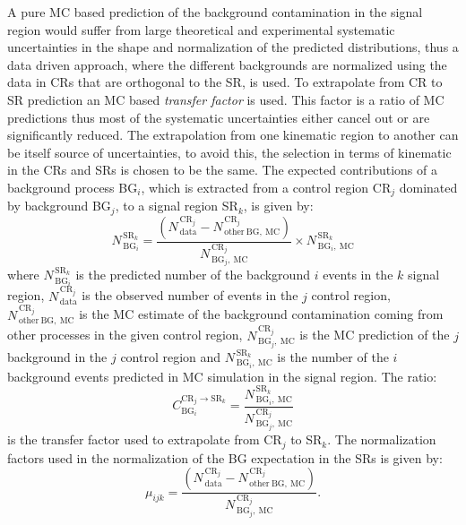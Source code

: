 A pure MC based prediction of the background contamination in the signal region
would suffer from large theoretical and experimental systematic uncertainties in
the shape and normalization of the predicted distributions, thus a data driven
approach, where the different backgrounds are normalized using the data in CRs
that are orthogonal to the SR, is used. To extrapolate from CR to SR prediction
an MC based \emph{transfer factor} is used. This factor is a ratio of MC
predictions thus most of the systematic uncertainties either cancel out or are
significantly reduced. The extrapolation from one kinematic region to another
can be itself source of uncertainties, to avoid this, the selection in terms of
kinematic in the CRs and SRs is chosen to be the same. The expected
contributions of a background process BG$_i$, which is extracted from a control
region CR$_j$ dominated by background BG$_j$, to a signal region SR$_k$, is
given by:
\begin{equation}
  \label{eq:83}
  N_{\mathrm{\, BG}_i}^{\mathrm{\, SR}_k} = \frac{(N_\mathrm{\,
      data}^{\mathrm{\, CR}_j} - N_\mathrm{\, other~BG,~MC}^{\mathrm{\,
        CR}_j})}{N^{\mathrm{\, CR}_j}_{\mathrm{\, BG}_j \mathrm{,~MC}}} \times
  N^{\mathrm{\, SR}_k}_{\mathrm{\, BG}_i,~\mathrm{MC}}
\end{equation}
where $N_{\mathrm{\, BG}_i}^{\mathrm{\, SR}_k}$ is the predicted number of the
background $i$ events in the $k$ signal region,
$N_\mathrm{\, data}^{\mathrm{\, CR}_j}$ is the observed number of events in the
$j$ control region, $N_\mathrm{\, other~BG,~MC}^{\mathrm{\, CR}_j}$ is the MC
estimate of the background contamination coming from other processes in the
given control region, $N^{\mathrm{\, CR}_j}_{\mathrm{\, BG}_j \mathrm{,~MC}}$ is
the MC prediction of the $j$ background in the $j$ control region and
$N^{\mathrm{\, SR}_k}_{\mathrm{\, BG}_i,~\mathrm{MC}}$ is the number of the $i$
background events predicted in MC simulation in the signal region. The ratio:
\begin{equation}
  \label{eq:84}
  C_{\mathrm{BG}_i}^{\mathrm{CR}_j \rightarrow \mathrm{SR}_k} = \frac{
    N^{\mathrm{\, SR}_k}_{\mathrm{\, BG}_i,~\mathrm{MC}}}{N^{\mathrm{\,
        CR}_j}_{\mathrm{\, BG}_j \mathrm{,~MC}}}
\end{equation}
is the transfer factor used to extrapolate from CR$_j$ to SR$_k$. The
normalization factors used in the normalization of the BG expectation in the SRs
is given by:
\begin{equation}
  \label{eq:85}
  \mu_{ijk} = \frac{(N_\mathrm{\, data}^{\mathrm{\, CR}_j} - N_\mathrm{\,
      other~BG,~MC}^{\mathrm{\, CR}_j})}{N^{\mathrm{\, CR}_j}_{\mathrm{\, BG}_j
      \mathrm{,~MC}}}.
\end{equation}
